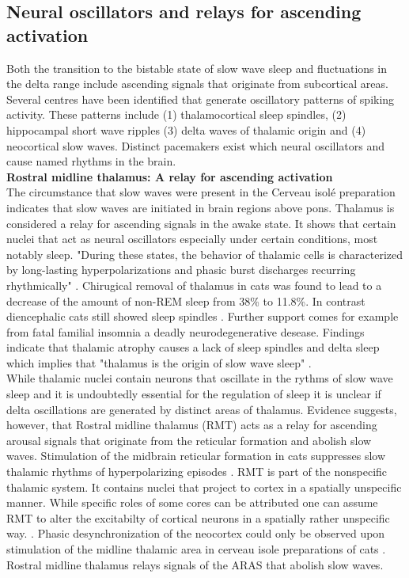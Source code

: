 
\subsection{Neural oscillators and relays for ascending activation}
\label{ascending_system_and_oscillators}
Both the transition to the bistable state of slow wave sleep and fluctuations in the delta range include ascending signals that originate from subcortical  areas. Several centres have been identified that generate oscillatory patterns of spiking activity. These patterns include (1) thalamocortical sleep spindles, (2) hippocampal short wave ripples (3) delta waves of thalamic origin and (4) neocortical slow waves. Distinct pacemakers exist which neural oscillators and cause named rhythms in the brain.\\

\textbf{Rostral midline thalamus: A relay for ascending activation}\\
The circumstance that slow waves were present in the Cerveau isolé preparation indicates that slow waves are initiated in brain regions above pons. Thalamus is considered a relay for ascending signals in the awake state. It shows that certain nuclei that act as neural oscillators especially under certain conditions, most notably sleep. "During these states, the behavior of thalamic cells is characterized by long-lasting hyperpolarizations and phasic burst discharges recurring rhythmically" \parencite[p. 21]{steriade1984thalamus}. Chirugical removal of thalamus in cats was found to lead to a decrease of the amount of non-REM sleep from 38\% to 11.8\%. In contrast diencephalic cats still showed sleep spindles \parencite{montagna2005fatal}. Further support comes for example from fatal familial insomnia a deadly neurodegenerative desease. Findings indicate that thalamic atrophy causes a lack of sleep spindles and delta sleep which implies that "thalamus is the origin of slow wave sleep" \parencite[p. 339]{montagna2005fatal}.\\
While thalamic nuclei contain neurons that oscillate in the rythms of slow wave sleep and it is undoubtedly essential for the regulation of sleep it is unclear if delta oscillations are generated by distinct areas of thalamus. Evidence suggests, however, that Rostral midline thalamus (RMT) acts as a relay for ascending arousal signals that originate from the reticular formation and abolish slow waves. Stimulation of the midbrain reticular formation in cats suppresses slow thalamic rhythms of hyperpolarizing episodes \parencite{steriade1984thalamus}. RMT is part of the nonspecific thalamic system. It contains nuclei that project to cortex in a spatially unspecific manner. While specific roles of some cores can be attributed one can assume RMT to alter the excitabilty of cortical neurons in a spatially rather unspecific way. \parencite{vertes2015limbic}. Phasic desynchronization of the neocortex could only be observed upon stimulation of the midline thalamic area in cerveau isole preparations of cats \parencite{kawamura1968hippocampal}. Rostral midline thalamus relays signals of the ARAS that abolish slow waves.\\

